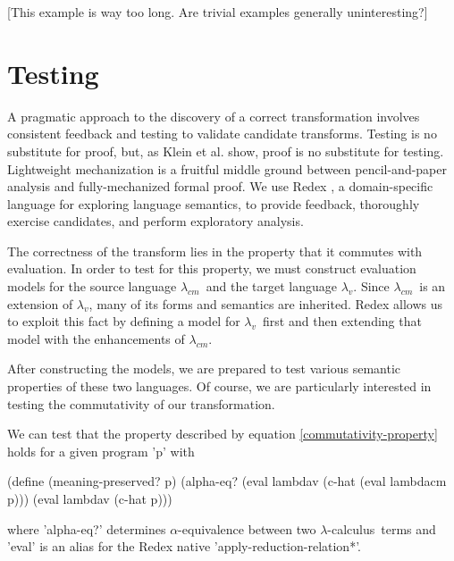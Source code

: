 \documentclass{llncs}
\newcommand{\cm}[0]{$\lambda_{cm}$}
\newcommand{\lv}[0]{$\lambda_v$}
\newcommand{\lc}[0]{$\lambda$-calculus}
\begin{document}
[This example is way too long. Are trivial examples generally uninteresting?]



\section{Testing}
\label{sec-testing}

A pragmatic approach to the discovery of a correct transformation involves consistent feedback and testing to validate candidate transforms. Testing is no substitute for proof, but, as Klein et al. \cite{klein2012run} show, proof is no substitute for testing. Lightweight mechanization is a fruitful middle ground between pencil-and-paper analysis and fully-mechanized formal proof. We use Redex \cite{findler2010redex}, a domain-specific language for exploring language semantics, to provide feedback, thoroughly exercise candidates, and perform exploratory analysis.

The correctness of the transform lies in the property that it commutes with evaluation. In order to test for this property, we must construct evaluation models for the source language \cm\ and the target language \lv. Since \cm\ is an extension of \lv, many of its forms and semantics are inherited. Redex allows us to exploit this fact by defining a model for \lv\ first and then extending that model with the enhancements of \cm.

After constructing the models, we are prepared to test various semantic properties of these two languages. Of course, we are particularly interested in testing the commutativity of our transformation.



We can test that the property described by equation \ref{commutativity-property} holds for a given program \scheme'p' with 
\begin{schemedisplay}
(define (meaning-preserved? p)
  (alpha-eq? (eval lambdav (c-hat (eval lambdacm p))) (eval lambdav (c-hat p)))
\end{schemedisplay}
where \scheme'alpha-eq?' determines $\alpha$-equivalence between two \lc\ terms and \scheme'eval' is an alias for the Redex native \scheme'apply-reduction-relation*'.
\end{document}
